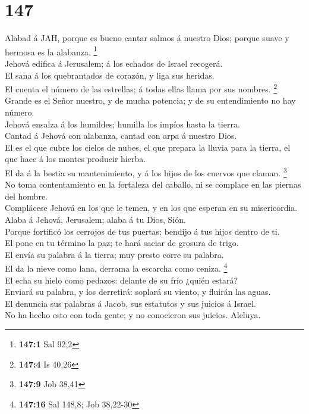 \hypertarget{section-146}{%
\section{147}\label{section-146}}

 Alabad á JAH, porque es bueno cantar salmos á nuestro Dios;
porque suave y hermosa es la alabanza. \footnote{\textbf{147:1} Sal 92,2}\\
 Jehová edifica á Jerusalem; á los echados de Israel
recogerá.\\
 El sana á los quebrantados de corazón, y liga sus
heridas.\\
 El cuenta el número de las estrellas; á todas ellas llama
por sus nombres. \footnote{\textbf{147:4} Is 40,26}\\
 Grande es el Señor nuestro, y de mucha potencia; y de su
entendimiento no hay número.\\
 Jehová ensalza á los humildes; humilla los impíos hasta la
tierra.\\
 Cantad á Jehová con alabanza, cantad con arpa á nuestro
Dios.\\
 El es el que cubre los cielos de nubes, el que prepara la
lluvia para la tierra, el que hace á los montes producir hierba.\\
 El da á la bestia su mantenimiento, y á los hijos de los
cuervos que claman. \footnote{\textbf{147:9} Job 38,41}\\
 No toma contentamiento en la fortaleza del caballo, ni se
complace en las piernas del hombre.\\
 Complácese Jehová en los que le temen, y en los que
esperan en su misericordia.\\
 Alaba á Jehová, Jerusalem; alaba á tu Dios, Sión.\\
 Porque fortificó los cerrojos de tus puertas; bendijo á
tus hijos dentro de ti.\\
 El pone en tu término la paz; te hará saciar de grosura de
trigo.\\
 El envía su palabra á la tierra; muy presto corre su
palabra.\\
 El da la nieve como lana, derrama la escarcha como ceniza.
\footnote{\textbf{147:16} Sal 148,8; Job 38,22-30}\\
 El echa su hielo como pedazos: delante de su frío ¿quién
estará?\\
 Enviará su palabra, y los derretirá: soplará su viento, y
fluirán las aguas.\\
 El denuncia sus palabras á Jacob, sus estatutos y sus
juicios á Israel.\\
 No ha hecho esto con toda gente; y no conocieron sus
juicios. Aleluya.

